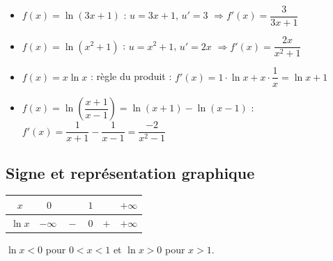 \begin{exemple}
  \begin{itemize}
    \item $f(x) = \ln(3x+1)$ :
    \quad $u = 3x+1$, $u' = 3$
    \quad $\Rightarrow f'(x) = \dfrac{3}{3x+1}$

    \medskip
    \item $f(x) = \ln(x^2+1)$ :
    \quad $u = x^2+1$, $u' = 2x$
    \quad $\Rightarrow f'(x) = \dfrac{2x}{x^2+1}$

    \medskip
    \item $f(x) = x\ln x$ :
    \quad r\`{e}gle du produit :
    $f'(x) = 1 \cdot \ln x + x \cdot \dfrac{1}{x} = \ln x + 1$

    \medskip
    \item $f(x) = \ln\!\left(\dfrac{x+1}{x-1}\right) = \ln(x+1) - \ln(x-1)$ :
    \quad $f'(x) = \dfrac{1}{x+1} - \dfrac{1}{x-1} = \dfrac{-2}{x^2-1}$
  \end{itemize}
\end{exemple}

\subsection{Signe et repr\'{e}sentation graphique}

\begin{propriete}[Signe de $\ln x$]
  \bigskip
  \begin{center}
  \renewcommand{\arraystretch}{1.8}
  \begin{tabular}{|c|ccccc|}
    \hline
    $x$      & $0$ && $1$ && $+\infty$ \\
    \hline
    $\ln x$  & \multicolumn{2}{c}{$-\infty \quad -$} & $0$ & $+$ & $+\infty$ \\
    \hline
  \end{tabular}
  \end{center}

  \medskip
  $\ln x < 0$ pour $0 < x < 1$ \quad et \quad $\ln x > 0$ pour $x > 1$.
\end{propriete}

